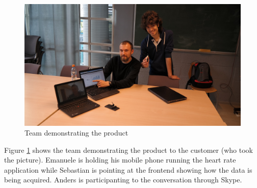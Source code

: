 \begin{figure}[h]
\centering
\includegraphics[scale=0.33]{../Figures/demo-m1.jpg}
\caption{Team demonstrating the product}
\label{figure:demonstration-m1}
\end{figure}

Figure \ref{figure:demonstration-m1} shows the team demonstrating the product to the customer (who took the picture).
Emanuele is holding his mobile phone running the heart rate application while Sebastian is pointing at the frontend
showing how the data is being acquired. Anders is participanting to the conversation through Skype.

